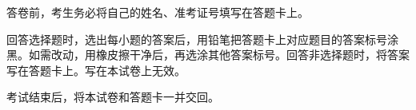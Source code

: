 \documentclass[a4paper,11pt]{report}
\begin{document}
\examfontsize



\noticetitle
\begin{examnotice}
\item 答卷前，考生务必将自己的姓名、准考证号填写在答题卡上。
\item 回答选择题时，选出每小题的答案后，用铅笔把答题卡上对应题目的答案标号涂黑。如需改动，用橡皮擦干净后，再选涂其他答案标号。回答非选择题时，将答案写在答题卡上。写在本试卷上无效。
\item 考试结束后，将本试卷和答题卡一并交回。
\end{examnotice}

\end{document}
